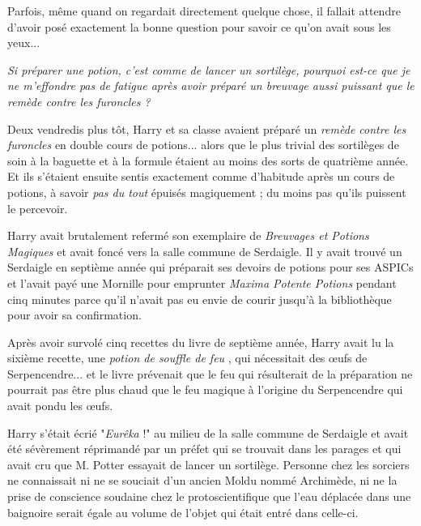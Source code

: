Parfois, même quand on regardait directement quelque chose, il fallait attendre d'avoir posé exactement la bonne question pour savoir ce qu'on avait sous les yeux...

\emph{Si préparer une potion, c'est comme de lancer un sortilège, pourquoi est-ce que je ne m'effondre pas de fatigue après avoir préparé un breuvage aussi puissant que le remède contre les furoncles ?} 

Deux vendredis plus tôt, Harry et sa classe avaient préparé un \emph{remède contre les furoncles}  en double cours de potions... alors que le plus trivial des sortilèges de soin à la baguette et à la formule étaient au moins des sorts de quatrième année. Et ils s'étaient ensuite sentis exactement comme d'habitude après un cours de potions, à savoir \emph{pas du tout}  épuisés magiquement ; du moins pas qu'ils puissent le percevoir.

Harry avait brutalement refermé son exemplaire de \emph{Breuvages et Potions Magiques } et avait foncé vers la salle commune de Serdaigle. Il y avait trouvé un Serdaigle en septième année qui préparait ses devoirs de potions pour ses ASPICs et l'avait payé une Mornille pour emprunter \emph{Maxima Potente Potions}  pendant cinq minutes parce qu'il n'avait pas eu envie de courir jusqu'à la bibliothèque pour avoir sa confirmation.

Après avoir survolé cinq recettes du livre de septième année, Harry avait lu la sixième recette, une \emph{potion de souffle de feu} , qui nécessitait des œufs de Serpencendre... et le livre prévenait que le feu qui résulterait de la préparation ne pourrait pas être plus chaud que le feu magique à l'origine du Serpencendre qui avait pondu les œufs.

Harry s'était écrié "\emph{Eurêka } !" au milieu de la salle commune de Serdaigle et avait été sévèrement réprimandé par un préfet qui se trouvait dans les parages et qui avait cru que M. Potter essayait de lancer un sortilège. Personne chez les sorciers ne connaissait ni ne se souciait d'un ancien Moldu nommé Archimède, ni ne la prise de conscience soudaine chez le protoscientifique que l'eau déplacée dans une baignoire serait égale au volume de l'objet qui était entré dans celle-ci.

